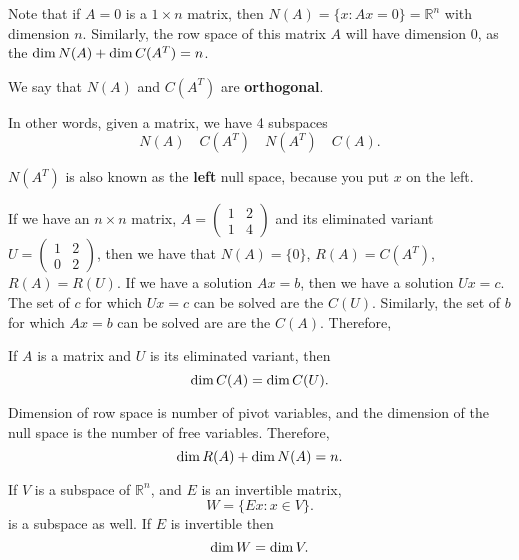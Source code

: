 
Note that if \( A=0 \) is a \( 1\times n \) matrix, then \( N(A) = \{x : Ax=0\} = \mathbb{R}^{n}  \) with dimension \( n \). Similarly, the row space of this matrix \( A \) will have dimension 0, as the \( \operatorname{dim} N(A) + \operatorname{dim} C(A^{T} ) =n\).

\begin{definition}
	We say that \( N(A) \) and \( C(A^{T} ) \) are \textbf{orthogonal}.
\end{definition}

In other words, given a matrix, we have 4 subspaces \[
	N(A) \quad C(A^{T}) \quad N(A^{T} ) \quad C(A)
.\] 

\begin{definition}
	\( N(A^{T} ) \) is also known as the \textbf{left} null space, because you put \( x \) on the left.
\end{definition}

If we have an \( n\times n \) matrix, \( A = \begin{pmatrix}
	1 & 2 \\ 1 & 4
\end{pmatrix} \) and its eliminated variant \( U=\begin{pmatrix}
	1 & 2  \\ 0 & 2
\end{pmatrix} \), then we have that \( N(A) = \{0\}   \), \( R(A) = C(A^{T} ) \), \( R(A) = R(U) \). If we have a solution \( Ax=b \), then we have a solution \( Ux=c \). The set of \( c \) for which \( Ux=c \) can be solved are the \( C(U) \). Similarly, the set of \( b \) for which \( Ax=b \) can be solved are are the \( C(A) \). Therefore, 

\begin{prop}
	If \( A \) is a matrix and \( U \) is its eliminated variant, then \[
	\operatorname{dim} C(A) = \operatorname{dim} C(U)
.\] 
\end{prop}

\begin{prop}
	Dimension of row space is number of pivot variables, and the dimension of the null space is the number of free variables. Therefore, \[
		\operatorname{dim} R(A) + \operatorname{dim} N(A) = n
	.\] 
\end{prop}

\begin{prop}
	If \( V \) is a subspace of \( \mathbb{R}^{n}  \), and \( E \) is an invertible matrix, \[
		W = \{Ex : x \in V\}  
	.\] is a subspace as well. If \( E \) is invertible then \[
		\operatorname{dim} W = \operatorname{dim} V
	.\]  
\end{prop}

